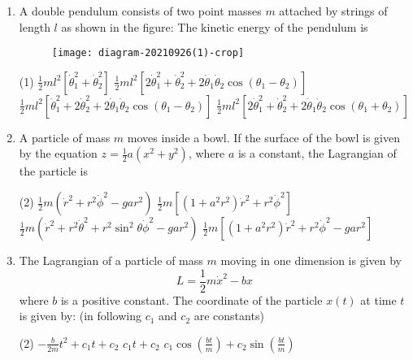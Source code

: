 \begin{enumerate}
	\item A double pendulum consists of two point masses $m$ attached by strings of length $l$ as shown in the figure: The kinetic energy of the pendulum is
	{}
	\begin{figure}[H]
		\centering
		\texttt{[image: diagram-20210926(1)-crop]}
	\end{figure}
	\begin{tasks}(1)
		\task[\textbf{A.}] $\frac{1}{2} m l^{2}\left[\dot{\theta}_{1}^{2}+\dot{\theta}_{2}^{2}\right]$
		\task[\textbf{B.}] $\frac{1}{2} m l^{2}\left[2 \dot{\theta}_{1}^{2}+\dot{\theta}_{2}^{2}+2 \dot{\theta}_{1} \dot{\theta}_{2} \cos \left(\theta_{1}-\theta_{2}\right)\right]$
		\task[\textbf{C.}] $\frac{1}{2} m l^{2}\left[\dot{\theta}_{1}^{2}+2 \dot{\theta}_{2}^{2}+2 \dot{\theta}_{1} \dot{\theta}_{2} \cos \left(\theta_{1}-\theta_{2}\right)\right]$
		\task[\textbf{D.}] $\frac{1}{2} m l^{2}\left[2 \dot{\theta}_{1}^{2}+\dot{\theta}_{2}^{2}+2 \dot{\theta}_{1} \dot{\theta}_{2} \cos \left(\theta_{1}+\theta_{2}\right)\right]$
	\end{tasks}
	\item A particle of mass $m$ moves inside a bowl. If the surface of the bowl is given by the equation $z=\frac{1}{2} a\left(x^{2}+y^{2}\right)$, where $a$ is a constant, the Lagrangian of the particle is
	{}
	\begin{tasks}(2)
		\task[\textbf{A.}] $\frac{1}{2} m\left(\dot{r}^{2}+r^{2} \dot{\phi}^{2}-g a r^{2}\right)$
		\task[\textbf{B.}] $\frac{1}{2} m\left[\left(1+a^{2} r^{2}\right) \dot{r}^{2}+r^{2} \dot{\phi}^{2}\right]$
		\task[\textbf{C.}]  $\frac{1}{2} m\left(\dot{r}^{2}+r^{2} \dot{\theta}^{2}+r^{2} \sin ^{2} \theta \dot{\phi}^{2}-g a r^{2}\right)$
		\task[\textbf{D.}]  $\frac{1}{2} m\left[\left(1+a^{2} r^{2}\right) \dot{r}^{2}+r^{2} \dot{\phi}^{2}-g a r^{2}\right]$
	\end{tasks}
	\item The Lagrangian of a particle of mass $m$ moving in one dimension is given by
	$$
	L=\frac{1}{2} m \dot{x}^{2}-b x
	$$
	where $b$ is a positive constant. The coordinate of the particle $x(t)$ at time $t$ is given by: (in following $c_{1}$ and $c_{2}$ are constants)
	{}
	\begin{tasks}(2)
		\task[\textbf{A.}] $-\frac{b}{2 m} t^{2}+c_{1} t+c_{2}$
		\task[\textbf{B.}] $c_{1} t+c_{2}$
		\task[\textbf{C.}] $c_{1} \cos \left(\frac{b t}{m}\right)+c_{2} \sin \left(\frac{b t}{m}\right)$

\end{tasks}
\end{enumerate}
